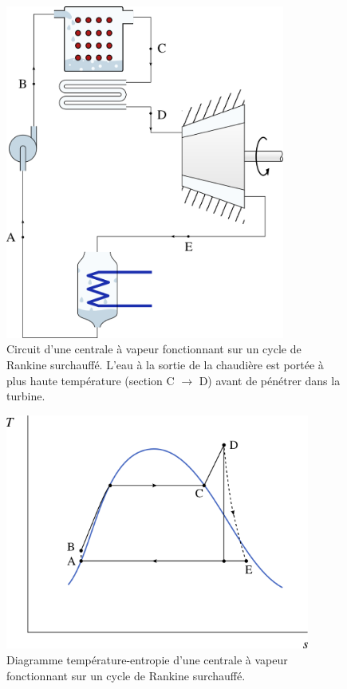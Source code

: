 		\begin{figure}
			\begin{center}
				\includegraphics[height=11cm]{images/circuit_rankine_surchauffe.png}
			\end{center}
			\caption{Circuit d’une centrale à vapeur fonctionnant sur un cycle de Rankine surchauffé. L’eau à la sortie de la chaudière est portée à plus haute température (section C $\rightarrow $ D) avant de pénétrer dans la turbine.}
			\label{fig_cycle_rankine_surchauffe}
		\end{figure}

		\begin{figure}
			\begin{center}
				\includegraphics[width=10cm]{images/ts_lv_rankine_surchauffe.png}
			\end{center}
			\caption{Diagramme température-entropie d’une centrale à vapeur fonctionnant sur un cycle de Rankine surchauffé.}
			\label{fig_ts_lv_rankine_surchauffe}
		\end{figure}

